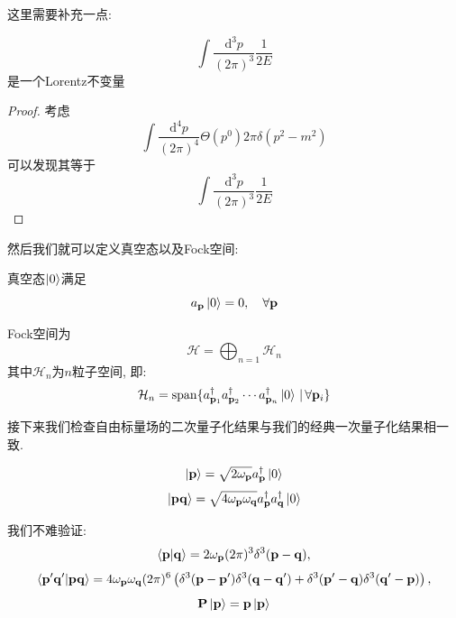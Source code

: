 这里需要补充一点:
\begin{theorem}[Lorentz不变的体元]
    \begin{equation}
        \int\frac{\mathrm d^3p}{(2\pi)^3}\frac1{2E}
    \end{equation}
    是一个Lorentz不变量
\end{theorem}
\begin{proof}
    考虑
    \begin{equation}
        \int\frac{\mathrm d^4p}{(2\pi)^4}\Theta(p^0) 2\pi\delta(p^2-m^2)
    \end{equation}
    可以发现其等于
    \begin{equation}
        \int\frac{\mathrm d^3p}{(2\pi)^3}\frac1{2E}
    \end{equation}
\end{proof}
然后我们就可以定义真空态以及Fock空间:
\begin{definition}[真空态]
    真空态$\ket0$满足
    \begin{equation}
        a_{\mathbf{p}}\ket0=0, \quad \forall \mathbf{p}
    \end{equation}
\end{definition}
\begin{definition}[Fock空间]
    Fock空间为
    \begin{equation}
        \mathcal H=\bigoplus_{n=1}\mathcal H_n
    \end{equation}
    其中$\mathcal H_n$为$n$粒子空间, 即:
    \begin{equation}
        \mathcal H_n=\mathrm{span}\{a_{\mathbf{p}_1}^\dagger a_{\mathbf{p}_2}^\dagger \cdots a_{\mathbf{p}_n}^\dagger \ket0 \,|\, \forall \mathbf{p}_i\}
    \end{equation}
\end{definition}
接下来我们检查自由标量场的二次量子化结果与我们的经典一次量子化结果相一致.

\begin{definition}[动量本征态]
    \begin{equation}
        \ket{\mathbf{p}}=\sqrt{2\omega_{\mathbf{p}}}a^\dagger_{\mathbf{p}}\ket0
    \end{equation}
    \begin{equation}
        \ket{\mathbf{p}\mathbf{q}}=\sqrt{4\omega_{\mathbf{p}}\omega_{\mathbf{q}}}a^\dagger_{\mathbf{p}}a^\dagger_{\mathbf{q}}\ket0
    \end{equation}
\end{definition}
我们不难验证:
\begin{equation}
    \braket{\mathbf{p}|\mathbf{q}}=2\omega_{\mathbf{p}}(2\pi)^3\delta^3(\mathbf{p}-\mathbf{q}),
\end{equation}
\begin{equation}
    \braket{\mathbf{p}'\mathbf{q}'|\mathbf{p}\mathbf{q}}=4\omega_{\mathbf{p}}\omega_{\mathbf{q}}(2\pi)^6\left(\delta^3(\mathbf{p}-\mathbf{p}')\delta^3(\mathbf{q}-\mathbf{q}')+\delta^3(\mathbf{p}'-\mathbf{q})\delta^3(\mathbf{q}'-\mathbf{p})\right),
\end{equation}
\begin{equation}
    \mathbf{P}\ket{\mathbf{p}}=\mathbf{p}\ket{\mathbf{p}}
\end{equation}

